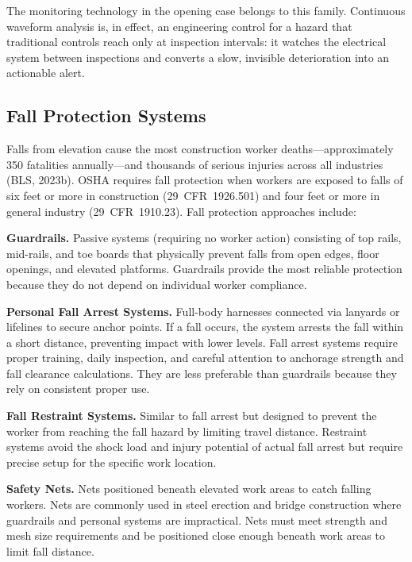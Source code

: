 \documentclass[11pt,openany]{book}
\begin{document}
The monitoring technology in the opening case belongs to this family.
Continuous waveform analysis is, in effect, an engineering control for a
hazard that traditional controls reach only at inspection intervals: it
watches the electrical system between inspections and converts a slow,
invisible deterioration into an actionable alert.

\subsection{Fall Protection Systems}

Falls from elevation cause the most construction worker
deaths---approximately 350 fatalities annually---and thousands of serious
injuries across all industries (BLS, 2023b). OSHA requires fall protection
when workers are exposed to falls of six feet or more in construction
(29~CFR~1926.501) and four feet or more in general industry (29~CFR~1910.23).
Fall protection approaches include:

\textbf{Guardrails.} Passive systems (requiring no worker action) consisting
of top rails, mid-rails, and toe boards that physically prevent falls from
open edges, floor openings, and elevated platforms. Guardrails provide the
most reliable protection because they do not depend on individual worker
compliance.

\textbf{Personal Fall Arrest Systems.} Full-body harnesses connected via
lanyards or lifelines to secure anchor points. If a fall occurs, the system
arrests the fall within a short distance, preventing impact with lower levels.
Fall arrest systems require proper training, daily inspection, and careful
attention to anchorage strength and fall clearance calculations. They are less
preferable than guardrails because they rely on consistent proper use.

\textbf{Fall Restraint Systems.} Similar to fall arrest but designed to
prevent the worker from reaching the fall hazard by limiting travel distance.
Restraint systems avoid the shock load and injury potential of actual fall
arrest but require precise setup for the specific work location.

\textbf{Safety Nets.} Nets positioned beneath elevated work areas to catch
falling workers. Nets are commonly used in steel erection and bridge
construction where guardrails and personal systems are impractical. Nets must
meet strength and mesh size requirements and be positioned close enough
beneath work areas to limit fall distance.
\end{document}
